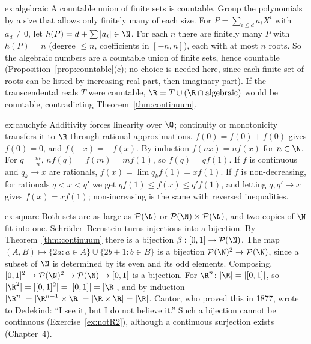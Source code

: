 \begin{solution}{ex:algebraic}
\idea A countable union of finite sets is countable. Group the polynomials by a size that allows only finitely many of each size.
\writeup For $P=\sum_{i\le d}a_iX^i$ with $a_d\ne0$, let $h(P)=d+\sum|a_i|\in\N$. For each $n$ there are finitely many $P$ with $h(P)=n$ (degree $\le n$, coefficients in
$[-n,n]$), each with at most $n$ roots. So the algebraic numbers are a countable union of finite sets, hence countable
(Proposition~\ref{prop:countable}(c); no choice is needed here, since each finite set of roots can be listed by increasing real part, then
imaginary part). If the transcendental reals $T$ were countable, $\R=T\cup(\R\cap\text{algebraic})$ would be countable, contradicting
Theorem~\ref{thm:continuum}.
\end{solution}

\begin{solution}{ex:cauchyfe}
\idea Additivity forces linearity over $\Q$; continuity or monotonicity transfers it to $\R$ through rational approximations.
\writeup $f(0)=f(0)+f(0)$ gives $f(0)=0$, and $f(-x)=-f(x)$. By induction $f(nx)=nf(x)$ for $n\in\N$. For $q=\frac mn$, $nf(q)=f(m)=mf(1)$, so $f(q)=qf(1)$. If
$f$ is continuous and $q_k\to x$ are rationals, $f(x)=\lim q_kf(1)=xf(1)$. If $f$ is non-decreasing, for rationals $q<x<q'$ we get
$qf(1)\le f(x)\le q'f(1)$, and letting $q,q'\to x$ gives $f(x)=xf(1)$; non-increasing is the same with reversed inequalities.
\end{solution}

\begin{solution}{ex:square}
\idea Both sets are as large as $\mathcal P(\N)$ or $\mathcal P(\N)\times\mathcal P(\N)$, and two copies of $\N$ fit into one. Schr\"oder--Bernstein turns
injections into a bijection.
\writeup By Theorem~\ref{thm:continuum} there is a bijection $\beta:[0,1]\to\mathcal P(\N)$. The map $(A,B)\mapsto\{2a:a\in A\}\cup\{2b+1:b\in B\}$ is a bijection
$\mathcal P(\N)^2\to\mathcal P(\N)$, since a subset of $\N$ is determined by its even and its odd elements. Composing, $[0,1]^2\to\mathcal P(\N)^2\to\mathcal P(\N)\to[0,1]$ is a
bijection. For $\R^n$: $|\R|=|[0,1]|$, so $|\R^2|=|[0,1]^2|=|[0,1]|=|\R|$, and by induction $|\R^n|=|\R^{n-1}\times\R|=|\R\times\R|=|\R|$. Cantor, who
proved this in 1877, wrote to Dedekind: ``I see it, but I do not believe it.'' Such a bijection cannot be continuous
(Exercise~\ref{ex:notR2}), although a continuous surjection exists (Chapter~4).
\end{solution}

